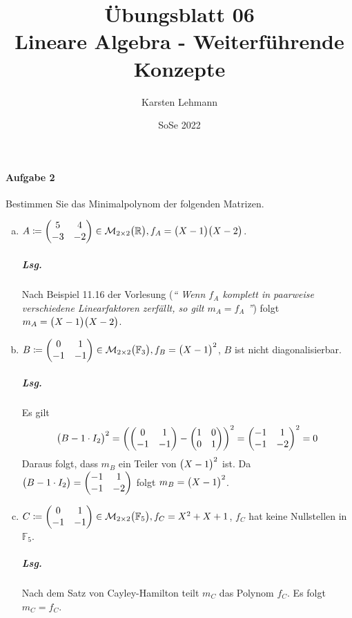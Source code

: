 \documentclass{scrreprt}
\author{Karsten Lehmann}
\date{SoSe 2022}
\title{Übungsblatt 06\\Lineare Algebra - Weiterführende Konzepte}
\begin{document}
\paragraph{Aufgabe 2} Bestimmen Sie das Minimalpolynom der folgenden Matrizen.
\begin{enumerate}[(a)]
\item $A \coloneqq \begin{pmatrix}
    5 & 4 \\
    -3 & -2 \\
  \end{pmatrix} \in \mathcal{M}_{2 \times 2}\qty\big(\mathbb{R}),
  f_A = \qty\big(X - 1)\qty\big(X - 2)$.

  \subparagraph{Lsg.} Nach Beispiel 11.16 der Vorlesung (\emph{``
    Wenn $f_A$ komplett in paarweise verschiedene Linearfaktoren zerfällt, so
    gilt $m_A = f_A$
  ''}) folgt $m_A = \qty\big(X - 1)\qty\big(X - 2)$.

\item $B \coloneqq \begin{pmatrix}
    0 & 1 \\
    -1 & -1 \\
  \end{pmatrix} \in \mathcal{M}_{2 \times 2}\qty\big(\mathbb{F}_3),
  f_B = \qty\big(X - 1)^2$, $B$ ist nicht diagonalisierbar.

  \subparagraph{Lsg.} Es gilt
  \[
    \qty\big(B - 1 \cdot I_2)^2 =
    \qty(\begin{pmatrix}
      0 & 1 \\
      -1 & -1 \\
    \end{pmatrix} - \begin{pmatrix}
      1 & 0 \\
      0 & 1 \\
    \end{pmatrix})^2
    = \begin{pmatrix}
      -1 & 1 \\
      -1 & -2 \\
    \end{pmatrix}^2
    = 0
  \]
  Daraus folgt, dass $m_B$ ein Teiler von $\qty\big(X - 1)^2$ ist.
  Da $\qty\big(B - 1 \cdot I_2) = \begin{pmatrix}
    -1 & 1 \\
    -1 & -2 \\
  \end{pmatrix}$ folgt $m_B = \qty\big(X - 1)^2$.

\item $C \coloneqq \begin{pmatrix}
    0 & 1 \\
    -1 & -1 \\
  \end{pmatrix} \in \mathcal{M}_{2 \times 2}\qty\big(\mathbb{F}_5),
  f_C = X^2 + X + 1$, $f_C$ hat keine Nullstellen in $\mathbb{F}_5$.

  \subparagraph{Lsg.} Nach dem Satz von Cayley-Hamilton teilt
  $m_C$ das Polynom $f_C$.
  Es folgt $m_C = f_C$.
\end{enumerate}
\end{document}
